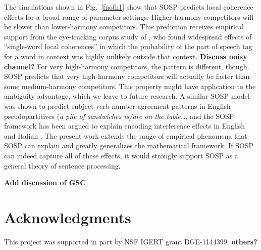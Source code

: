 \documentclass[10pt,letterpaper]{article}
\begin{document}
The simulations shown in Fig.~\ref{fnofh1} show that SOSP predicts local coherence effects for a broad range of parameter settings: Higher-harmony competitors will be slower than lower-harmony competitors. This prediction receives empirical support from the eye-tracking corpus study of , who found widespread effects of ``single-word local coherences'' in which the probability of the part of speech tag for a word in context was highly unlikely outside that context. \textbf{Discuss noisy channel?} For very high-harmony competitors, the pattern is different, though. SOSP predicts that very high-harmony competitors will actually be faster than some medium-harmony competitors. This property might have application to the ambiguity advantage, which we leave to future research. A similar SOSP model was shown to predict subject-verb number agreement patterns in English pseudopartitives (\emph{a pile of sandwiches is/are on the table\dots}, and the SOSP framework has been argued to explain encoding interference effects in English and Italian \cite{villata2018encoding}. The present work extends the range of empirical phenomena that SOSP can explain and greatly generalizes the mathematical framework. If SOSP can indeed capture all of these effects, it would strongly support SOSP as a general theory of sentence processing.

\textbf{Add discussion of GSC}



\section{Acknowledgments}
This project was supported in part by NSF IGERT grant DGE-1144399. \textbf{others?}


\setlength{\bibleftmargin}{.125in}
\setlength{\bibindent}{-\bibleftmargin}

\end{document}
